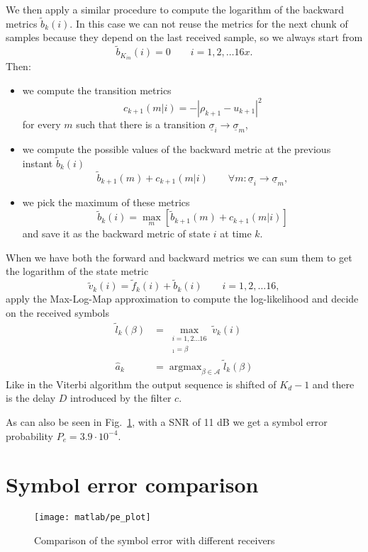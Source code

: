 \documentclass[a4paper,oneside]{article}
\renewcommand{\vec}[1]{\underline{#1}}
\newcommand{\abs}[1]{\left|#1\right|}
\DeclareMathOperator*{\argmax}{argmax}
\newcommand{\vsigma}[0]{\vec{\sigma}}
\begin{document}
We then apply a similar procedure to compute the logarithm of the
backward metrics $\tilde{b}_k(i)$. In this case we can not reuse the
metrics for the next chunk of samples because they depend on the last
received sample, so we always start from
\begin{equation}
  \tilde{b}_{K_{in}}(i) = 0 \qquad i = 1,2,\dots16x .
\end{equation}
Then:
\begin{itemize}
\item we compute the transition metrics
  \begin{equation}
    c_{k+1}(m|i) = -\abs{\rho_{k+1} - u_{k+1}}^2
  \end{equation}
  for every $m$ such that there is a transition $\vsigma_i \rightarrow
  \vsigma_m$,
  \item we compute the possible values of the backward metric at the
    previous instant $\tilde{b}_k(i)$
    \begin{equation}
      \tilde{b}_{k+1}(m) + c_{k+1}(m|i) \qquad \forall m : \vsigma_i
      \rightarrow \vsigma_m ,
    \end{equation}
    \item we pick the maximum of these metrics
    \begin{equation}
       \tilde{b}_{k}(i)  = \max_{m} \left[ \tilde{b}_{k+1}(m) + c_{k+1}(m|i) \right] 
    \end{equation}
    and save it as the backward metric of state $i$ at time $k$.
\end{itemize}

When we have both the forward and backward metrics we can sum them to
get the logarithm of the state metric
\begin{equation}
  \tilde{v}_k(i) = \tilde{f}_k(i) + \tilde{b}_k(i) \qquad i=1,2,\dots16 ,
\end{equation}
apply the Max-Log-Map approximation to compute the log-likelihood and
decide on the received symbols
\begin{align}
  \tilde{l}_k(\beta) &= \max_{\substack{i=1,2\dots16 \\ [\vsigma_i]_1 = \beta}} \tilde{v}_k(i) \\
  \hat{a}_k &= \argmax_{\beta \in \mathcal{A}} \tilde{l}_k(\beta)
\end{align}
Like in the Viterbi algorithm the output sequence is shifted of $K_d
-1$ and there is the delay $D$ introduced by the filter $c$.

As can also be seen in Fig.~\ref{plot:pe_all}, with a SNR of 11 dB we
get a symbol error probability {\color{red}$P_e = 3.9 \cdot 10^{-4}$.}
\section{Symbol error comparison}
\begin{figure}[htbp]
  \centering
  \texttt{[image: matlab/pe\_plot]}
  \caption{Comparison of the symbol error with different receivers}
  \label{plot:pe_all}
\end{figure}
\end{document}
